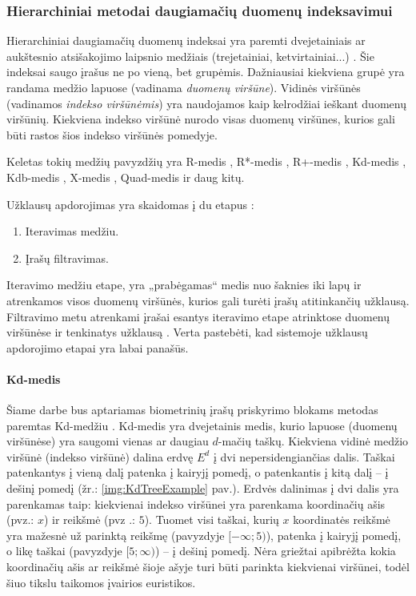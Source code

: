 \subsubsection{Hierarchiniai metodai daugiamačių duomenų indeksavimui}
\label{sec:HierarchicalIndices}

Hierarchiniai daugiamačių duomenų indeksai yra paremti dvejetainiais ar aukštesnio atsišakojimo laipsnio medžiais (trejetainiai, ketvirtainiai...) \cite{gaede1998multidimensional}.
Šie indeksai saugo įrašus ne po vieną, bet grupėmis.
Dažniausiai kiekviena grupė yra randama medžio lapuose (vadinama {\it duomenų viršūne}).
Vidinės viršūnės (vadinamos {\it indekso viršūnėmis}) yra naudojamos kaip kelrodžiai ieškant duomenų viršūnių.
Kiekviena indekso viršūnė nurodo visas duomenų viršūnes, kurios gali būti rastos šios indekso viršūnės pomedyje.

Keletas tokių medžių pavyzdžių yra R-medis \cite{guttman1984r}, R*-medis \cite{beckmann1990r}, R+-medis \cite{sellis1987r+}, Kd-medis \cite{bentley1979multidimensional}, Kdb-medis \cite{robinson1981kdb}, X-medis \cite{berchtold1996x}, Quad-medis \cite{habenicht1983quad} ir daug kitų.

Užklausų apdorojimas yra skaidomas į du etapus \cite{bohm2001searching}:
\begin{enumerate}
	\item Iteravimas medžiu.
	\item Įrašų filtravimas.
\end{enumerate}
Iteravimo medžiu etape, yra „prabėgamas“ medis nuo šaknies iki lapų ir atrenkamos visos duomenų viršūnės, kurios gali turėti įrašų atitinkančių užklausą.
Filtravimo metu atrenkami įrašai esantys iteravimo etape atrinktose duomenų viršūnėse ir tenkinatys užklausą \cite{brinkhoff1994multi} \cite{bohm2001searching}.
Verta pastebėti, kad sistemoje \cite{NeurotechnologyMegamatcherAccelerator} užklausų apdorojimo etapai yra labai panašūs.

\paragraph{Kd-medis}
\label{sec:Kd-tree}

Šiame darbe bus aptariamas biometrinių įrašų priskyrimo blokams metodas paremtas Kd-medžiu \cite{bentley1979multidimensional}.
Kd-medis yra dvejetainis medis, kurio lapuose (duomenų viršūnėse) yra saugomi vienas ar daugiau $d$-mačių taškų.
Kiekviena vidinė medžio viršūnė (indekso viršūnė) dalina erdvę $E^d$ į dvi nepersidengiančias dalis.
Taškai patenkantys į vieną dalį patenka į kairyjį pomedį, o patenkantis į kitą dalį -- į dešinį pomedį (žr.: \ref{img:KdTreeExample} pav.).
Erdvės dalinimas į dvi dalis yra parenkamas taip: kiekvienai indekso viršūnei yra parenkama koordinačių ašis (pvz.: $x$) ir reikšmė (pvz .: $5$).
Tuomet visi taškai, kurių $x$ koordinatės reikšmė yra mažesnė už parinktą reikšmę (pavyzdyje $[-\infty; 5)$), patenka į kairyjį pomedį, o likę taškai (pavyzdyje $[5; \infty)$) -- į dešinį pomedį.
Nėra griežtai apibrėžta kokia koordinačių ašis ar reikšmė šioje ašyje turi būti parinkta kiekvienai viršūnei, todėl šiuo tikslu taikomos įvairios euristikos.

